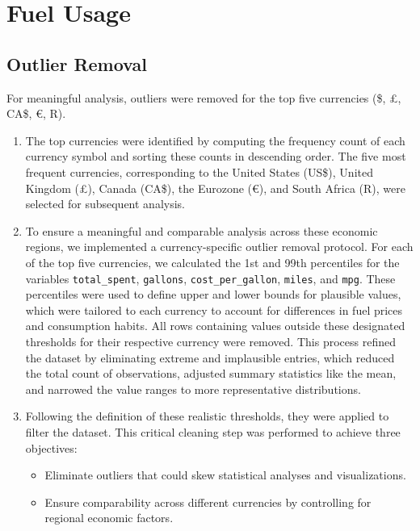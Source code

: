 \documentclass{article}
\begin{document}
\section{Fuel Usage}
\subsection{Outlier Removal}
For meaningful analysis, outliers were removed for the top five currencies (\$, £, CA\$, €, R).

\begin{enumerate}
    \item The top currencies were identified by computing the frequency count of each currency symbol and sorting these counts in descending order. The five most frequent currencies, corresponding to the United States (US\$), United Kingdom (£), Canada (CA\$), the Eurozone (€), and South Africa (R), were selected for subsequent analysis.

    \item To ensure a meaningful and comparable analysis across these economic regions, we implemented a currency-specific outlier removal protocol. For each of the top five currencies, we calculated the 1st and 99th percentiles for the variables \texttt{total\_spent}, \texttt{gallons}, \texttt{cost\_per\_gallon}, \texttt{miles}, and \texttt{mpg}. These percentiles were used to define upper and lower bounds for plausible values, which were tailored to each currency to account for differences in fuel prices and consumption habits. All rows containing values outside these designated thresholds for their respective currency were removed. This process refined the dataset by eliminating extreme and implausible entries, which reduced the total count of observations, adjusted summary statistics like the mean, and narrowed the value ranges to more representative distributions.

    \item Following the definition of these realistic thresholds, they were applied to filter the dataset. This critical cleaning step was performed to achieve three objectives:
    \begin{itemize}
        \item Eliminate outliers that could skew statistical analyses and visualizations.
        \item Ensure comparability across different currencies by controlling for regional economic factors.
    \end{itemize}
\end{enumerate}
\end{document}
